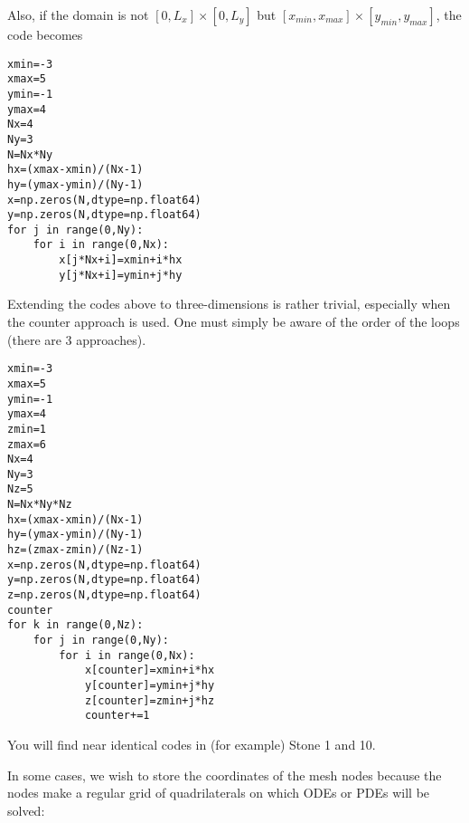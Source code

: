 Also, if the domain is not $[0,L_x]\times[0,L_y]$ but
$[x_{min},x_{max}]\times[y_{min},y_{max}]$, the code becomes
\begin{lstlisting}
xmin=-3
xmax=5
ymin=-1
ymax=4
Nx=4
Ny=3
N=Nx*Ny
hx=(xmax-xmin)/(Nx-1)
hy=(ymax-ymin)/(Ny-1)
x=np.zeros(N,dtype=np.float64)
y=np.zeros(N,dtype=np.float64)
for j in range(0,Ny):
    for i in range(0,Nx):
        x[j*Nx+i]=xmin+i*hx
        y[j*Nx+i]=ymin+j*hy
\end{lstlisting}

\vspace{.8cm}

Extending the codes above to three-dimensions is rather trivial, especially when the counter approach 
is used. One must simply be aware of the order of the loops (there are 3 approaches).
\begin{lstlisting}
xmin=-3
xmax=5
ymin=-1
ymax=4
zmin=1
zmax=6
Nx=4
Ny=3
Nz=5
N=Nx*Ny*Nz
hx=(xmax-xmin)/(Nx-1)
hy=(ymax-ymin)/(Ny-1)
hz=(zmax-zmin)/(Nz-1)
x=np.zeros(N,dtype=np.float64)
y=np.zeros(N,dtype=np.float64)
z=np.zeros(N,dtype=np.float64)
counter
for k in range(0,Nz):
    for j in range(0,Ny):
        for i in range(0,Nx):
            x[counter]=xmin+i*hx
            y[counter]=ymin+j*hy
            z[counter]=zmin+j*hz
            counter+=1
\end{lstlisting}
You will find near identical codes in (for example) Stone 1 and 10.

\vspace{.8cm}

In some cases, we wish to store the coordinates of the mesh nodes because the nodes 
make a regular grid of quadrilaterals on which ODEs or PDEs will be solved:

